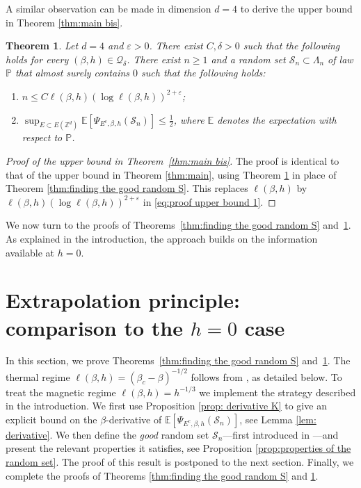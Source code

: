 \documentclass[11pt,a4paper]{article}
\numberwithin{equation}{section}
\theoremstyle{plain}
\newtheorem{Thm}{Theorem}[section]
\theoremstyle{definition}
\begin{document}
 A similar observation can be made in dimension $d=4$ to derive the upper bound in Theorem \ref{thm:main bis}.  
 \begin{Thm}\label{thm:finding the good random S d=4} Let $d=4$ and $\varepsilon>0$. There exist $C,\delta >0$ such that the following holds for every $(\beta,h)\in \mathcal Q_\delta$. There exist $n\geq 1$ and a random set $\mathcal S_n\subset \Lambda_n$ of law $\mathbb P$ that almost surely contains $0$ such that the following holds:
\begin{enumerate}
	\item[$(i)$] $n\leq C\ell(\beta,h)(\log \ell(\beta,h))^{2+\varepsilon}$;
	\item[$(ii)$] $\sup_{E\subset E(\mathbb Z^d)}\mathbb E[\Psi_{E^c,\beta,h}(\mathcal S_n)]\leq \tfrac{1}{2}$, where $\mathbb E$ denotes the expectation with respect to $\mathbb P$.
\end{enumerate}
\end{Thm}

\begin{proof}[Proof of the upper bound in Theorem~\textup{\ref{thm:main bis}}] The proof is identical to that of the upper bound in Theorem \ref{thm:main}, using Theorem \ref{thm:finding the good random S d=4} in place of Theorem \ref{thm:finding the good random S}. This replaces $\ell(\beta,h)$ by $\ell(\beta,h)(\log \ell(\beta,h))^{2+\varepsilon}$ in \eqref{eq:proof upper bound 1}.
\end{proof}

We now turn to the proofs of 
Theorems~\ref{thm:finding the good random S} 
and~\ref{thm:finding the good random S d=4}. As explained in the 
introduction, the approach builds on the information available at $h=0$.

\section{Extrapolation principle: comparison to the $h=0$ case}\label{sec:extrapolation}

In this section, we prove Theorems~\ref{thm:finding the good random S} 
and~\ref{thm:finding the good random S d=4}. The thermal regime $\ell(\beta,h)=(\beta_c-\beta)^{-1/2}$ follows from 
\cite{DuminilPanis2024newLB}, as detailed below. To treat the magnetic regime $\ell(\beta,h)=h^{-1/3}$ we implement the strategy described in the introduction. We first use Proposition \ref{prop: derivative K} to give an explicit bound on the $\beta$-derivative of $\mathbb E[\Psi_{E^c,\beta,h}(\mathcal S_n)]$, see Lemma \ref{lem: derivative}. We then define the \emph{good} random set $\mathcal S_n$---first introduced in \cite{DuminilPanis2024newLB}---and present the relevant properties it satisfies, see Proposition \ref{prop:properties of the random set}. The proof of this result is postponed to the next section. Finally, we complete the proofs of Theorems \ref{thm:finding the good random S} and \ref{thm:finding the good random S d=4}.
\end{document}
